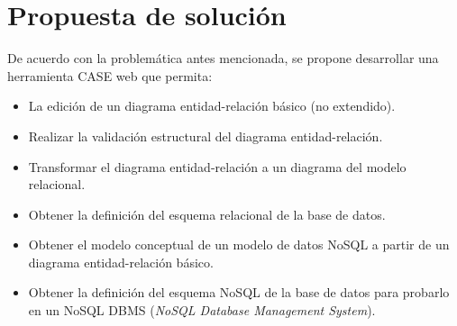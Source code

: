 \section{Propuesta de solución}

De acuerdo con la problemática antes mencionada, se propone desarrollar una herramienta CASE web que permita:

\begin{itemize}
    \item La edición de un diagrama entidad-relación básico (no extendido).
    \item Realizar la validación estructural del diagrama entidad-relación.
    \item Transformar el diagrama entidad-relación a un diagrama del modelo relacional.
    \item Obtener la definición del esquema relacional de la base de datos.
    \item Obtener el modelo conceptual de un modelo de datos NoSQL a partir de un diagrama entidad-relación básico.
    \item Obtener la definición del esquema NoSQL de la base de datos para probarlo en un NoSQL DBMS (\textit{NoSQL Database Management System}).
\end{itemize}